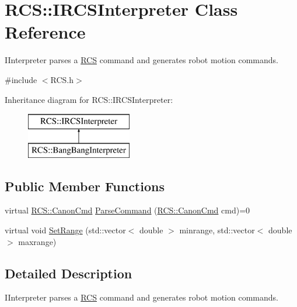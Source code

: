 \hypertarget{classRCS_1_1IRCSInterpreter}{\section{R\-C\-S\-:\-:I\-R\-C\-S\-Interpreter Class Reference}
\label{classRCS_1_1IRCSInterpreter}
}


I\-Interpreter parses a \hyperlink{namespaceRCS}{R\-C\-S} command and generates robot motion commands.  




{\ttfamily \#include $<$R\-C\-S.\-h$>$}

Inheritance diagram for R\-C\-S\-:\-:I\-R\-C\-S\-Interpreter\-:\begin{figure}[H]
\begin{center}
\leavevmode
\includegraphics[height=2.000000cm]{classRCS_1_1IRCSInterpreter}
\end{center}
\end{figure}
\subsection*{Public Member Functions}
\begin{DoxyCompactItemize}
\item 
virtual \hyperlink{structRCS_1_1CanonCmd}{R\-C\-S\-::\-Canon\-Cmd} \hyperlink{classRCS_1_1IRCSInterpreter_adb4258abff48650cc30398ec996d04c1}{Parse\-Command} (\hyperlink{structRCS_1_1CanonCmd}{R\-C\-S\-::\-Canon\-Cmd} cmd)=0
\item 
virtual void \hyperlink{classRCS_1_1IRCSInterpreter_a5181a696aed581ae842bfd31537cfc1f}{Set\-Range} (std\-::vector$<$ double $>$ minrange, std\-::vector$<$ double $>$ maxrange)
\end{DoxyCompactItemize}


\subsection{Detailed Description}
I\-Interpreter parses a \hyperlink{namespaceRCS}{R\-C\-S} command and generates robot motion commands. 

